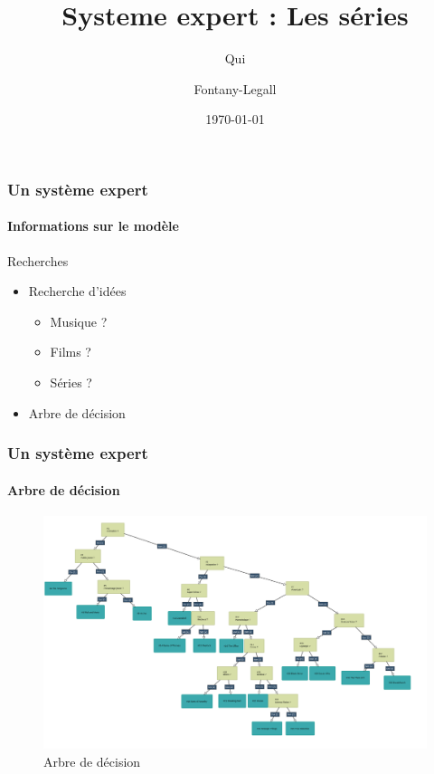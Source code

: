\documentclass[11pt]{beamer}
\author{Qui \and Fontany-Legall}
\title{Systeme expert : Les séries}
\institute{Université de Nice}
\date{\today}
\begin{document}
\begin{frame}
\titlepage
\end{frame}

\begin{frame}
\frametitle{Un système expert}
\framesubtitle {Informations sur le modèle}
\begin{block}{Recherches}
\begin{itemize}
\item Recherche d'idées
\begin{itemize}
\item Musique ?
\item Films ?
\item Séries ?
\end{itemize}
\item Arbre de décision
\end{itemize}
\end{block}
\end{frame}

\begin{frame}
\frametitle{Un système expert}
\framesubtitle{Arbre de décision}
\begin{figure}
\includegraphics[scale=0.2]{arbre.png}
\caption{Arbre de décision}
\end{figure}
\end{frame}
\end{document}
